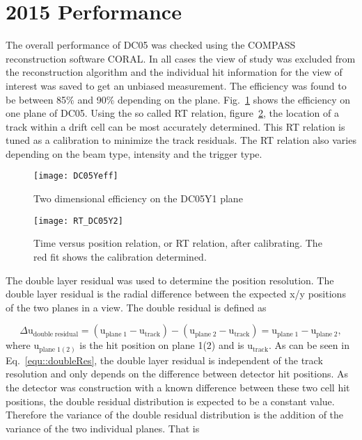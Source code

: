 \section{2015 Performance}
The overall performance of DC05 was checked using the COMPASS reconstruction
software CORAL.  In all cases the view of study was excluded from the
reconstruction algorithm and the individual hit information for the view of
interest was saved to get an unbiased measurement.  The efficiency was found to
be between 85\% and 90\% depending on the plane.  Fig.~\ref{fig::DC05Yeff} shows
the efficiency on one plane of DC05.  Using the so called RT relation,
figure~\ref{fig:RT_DC05Y2}, the location of a track within a drift cell can be
most accurately determined.  This RT relation is tuned as a calibration to
minimize the track residuals.  The RT relation also varies depending on the beam
type, intensity and the trigger type.

\begin{figure}[h!t]
  \centering \texttt{[image: DC05Yeff]}
  \caption{}{Two dimensional efficiency on the DC05Y1 plane}
  \label{fig::DC05Yeff}%
\end{figure}

\begin{figure}[h!t]
  \centering \texttt{[image: RT\_DC05Y2]}
  \caption{}{Time versus position relation, or RT relation, after calibrating.
    The red fit shows the calibration determined.}
  \label{fig:RT_DC05Y2}%
\end{figure}

The double layer residual was used to determine the position resolution.  The
double layer residual is the radial difference between the expected x/y
positions of the two planes in a view.  The double residual is defined as

\begin{equation}
  \label{equ::doubleRes}
  \Delta \mathrm{u}_{\mathrm{double \; residual}} = (\mathrm{u}_{\mathrm{plane
      \; 1}} - \mathrm{u}_{\mathrm{track}}) - (\mathrm{u}_{\mathrm{plane \; 2}}
  - \mathrm{u}_{\mathrm{track}}) = \mathrm{u}_{\mathrm{plane \; 1}} -
  \mathrm{u}_{\mathrm{plane \; 2}},
\end{equation}
\noindent
where u$_{\mathrm{plane \; 1(2)}}$ is the hit position on plane 1(2) and is
u$_{\mathrm{track}}$.  As can be seen in Eq.~\ref{equ::doubleRes}, the double
layer residual is independent of the track resolution and only depends on the
difference between detector hit positions.  As the detector was construction
with a known difference between these two cell hit positions, the double
residual distribution is expected to be a constant value.  Therefore the
variance of the double residual distribution is the addition of the variance of
the two individual planes.  That is

